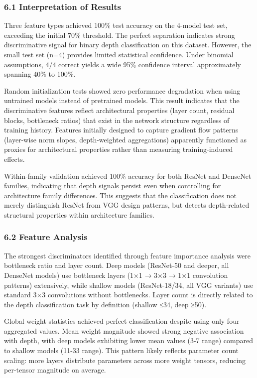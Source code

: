 
\subsubsection{6.1 Interpretation of Results}

Three feature types achieved 100\% test accuracy on the 4-model test set, exceeding the initial 70\% threshold. The perfect separation indicates strong discriminative signal for binary depth classification on this dataset. However, the small test set (n=4) provides limited statistical confidence. Under binomial assumptions, 4/4 correct yields a wide 95\% confidence interval approximately spanning 40\% to 100\%.

Random initialization tests showed zero performance degradation when using untrained models instead of pretrained models. This result indicates that the discriminative features reflect architectural properties (layer count, residual blocks, bottleneck ratios) that exist in the network structure regardless of training history. Features initially designed to capture gradient flow patterns (layer-wise norm slopes, depth-weighted aggregations) apparently functioned as proxies for architectural properties rather than measuring training-induced effects.

Within-family validation achieved 100\% accuracy for both ResNet and DenseNet families, indicating that depth signals persist even when controlling for architecture family differences. This suggests that the classification does not merely distinguish ResNet from VGG design patterns, but detects depth-related structural properties within architecture families.

\subsubsection{6.2 Feature Analysis}

The strongest discriminators identified through feature importance analysis were bottleneck ratio and layer count. Deep models (ResNet-50 and deeper, all DenseNet models) use bottleneck layers (1×1 → 3×3 → 1×1 convolution patterns) extensively, while shallow models (ResNet-18/34, all VGG variants) use standard 3×3 convolutions without bottlenecks. Layer count is directly related to the depth classification task by definition (shallow ≤34, deep ≥50).

Global weight statistics achieved perfect classification despite using only four aggregated values. Mean weight magnitude showed strong negative association with depth, with deep models exhibiting lower mean values (3-7 range) compared to shallow models (11-33 range). This pattern likely reflects parameter count scaling: more layers distribute parameters across more weight tensors, reducing per-tensor magnitude on average.

